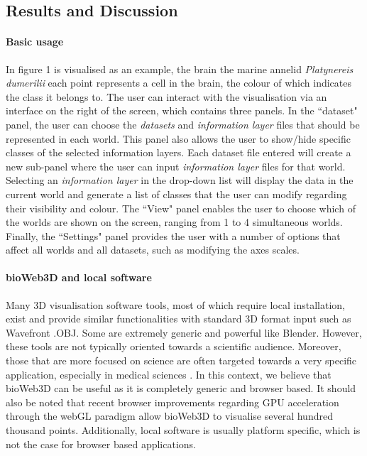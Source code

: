 	\subsection{Results and Discussion}


		\paragraph{Basic usage}
	In figure 1 is visualised as an example, the brain the marine annelid {\it{Platynereis dumerilii}} each point represents a cell in the brain, the colour of which indicates the class it belongs to. The user can interact with the visualisation via an interface on the right of the screen, which contains three panels. In the ``dataset" panel, the user can choose the {\it{datasets}} and {\it{information layer}} files that should be represented in each world. This panel also allows the user to show/hide specific classes of the selected information layers. Each dataset file entered will create a new sub-panel where the user can input {\it{information layer}} files for that world. Selecting an {\it{information layer}} in the drop-down list will display the data in the current world and generate a list of classes that the user can modify regarding their visibility and colour. The ``View" panel enables the user to choose which of the worlds are shown on the screen, ranging from 1 to 4 simultaneous worlds. Finally, the ``Settings" panel provides the user with a number of options that affect all worlds and all datasets, such as modifying the axes scales.

		\paragraph{bioWeb3D and local software}
Many 3D visualisation software tools, most of which require local installation, exist and provide similar functionalities with standard 3D format input such as Wavefront .OBJ. Some are extremely generic and powerful like Blender. However, these tools are not typically oriented towards a scientific audience. Moreover, those that are more focused on science are often targeted towards a very specific application, especially in medical sciences \cite{Wang09}. In this context, we believe that bioWeb3D can be useful as it is completely generic and browser based. It should also be noted that recent browser improvements regarding GPU acceleration through the webGL paradigm allow bioWeb3D to visualise several hundred thousand points. Additionally, local software is usually platform specific, which is not the case for browser based applications.

